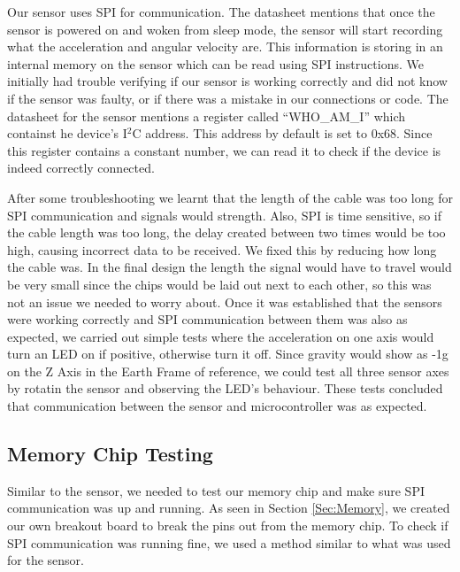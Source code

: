 Our sensor uses SPI for communication.
The datasheet mentions that once the sensor is powered on and woken from sleep mode,
the sensor will start recording what the acceleration and angular velocity are.
This information is storing in an internal memory on the sensor which can be read using SPI instructions.
We initially had trouble verifying if our sensor is working correctly and did not know if the sensor was faulty,
or if there was a mistake in our connections or code.
The datasheet for the sensor mentions a register called ``WHO\_AM\_I'' which containst he device's I$^2$C address.
This address by default is set to 0x68.
Since this register contains a constant number, we can read it to check if the device is indeed correctly connected.

After some troubleshooting we learnt that the length of the cable was too long for SPI communication and signals would strength.
Also, SPI is time sensitive, so if the cable length was too long,
the delay created between two times would be too high,
causing incorrect data to be received.
We fixed this by reducing how long the cable was.
In the final design the length the signal would have to travel would be very small since the chips would be laid out next to each other,
so this was not an issue we needed to worry about.
Once it was established that the sensors were working correctly and SPI communication between them was also as expected,
we carried out simple tests where the acceleration on one axis would turn an LED on if positive,
otherwise turn it off.
Since gravity would show as -1g on the Z Axis in the Earth Frame of reference,
we could test all three sensor axes by rotatin the sensor and observing the LED's behaviour.
These tests concluded that communication between the sensor and microcontroller was as expected.

\subsection{Memory Chip Testing}
\label{Sec:MemoryTesting}
Similar to the sensor, we needed to test our memory chip and make sure SPI communication was up and running.
As seen in Section \ref{Sec:Memory},
we created our own breakout board to break the pins out from the memory chip.
To check if SPI communication was running fine,
we used a method similar to what was used for the sensor.





















